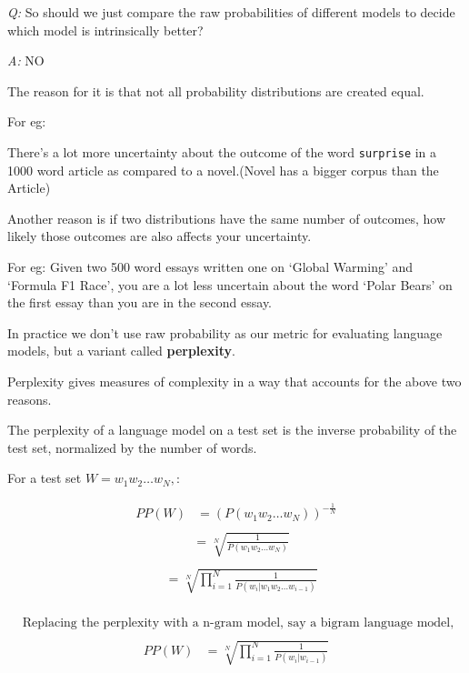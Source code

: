 \documentclass[11pt]{article}
\begin{document}
\emph{Q:} So should we just compare the raw probabilities of different
models to decide which model is intrinsically better?

\emph{A:} NO

The reason for it is that not all probability distributions are created
equal.

For eg:

There's a lot more uncertainty about the outcome of the word
\texttt{surprise} in a 1000 word article as compared to a novel.(Novel
has a bigger corpus than the Article)

Another reason is if two distributions have the same number of outcomes,
how likely those outcomes are also affects your uncertainty.

For eg: Given two 500 word essays written one on `Global Warming' and
`Formula F1 Race', you are a lot less uncertain about the word `Polar
Bears' on the first essay than you are in the second essay.

In practice we don't use raw probability as our metric for evaluating
language models, but a variant called \textbf{perplexity}.

Perplexity gives measures of complexity in a way that accounts for the
above two reasons.

The perplexity of a language model on a test set is the inverse
probability of the test set, normalized by the number of words.

For a test set \(W = w_1 w_2 \dots w_N ,\):

\[\begin{align} PP(W) &= {(P(w_1 w_2 \dots w_N))}^{-\frac{1}{N}}\\\end{align}\]
\[\begin{align}&= \sqrt[N]{\frac{1}{P(w_1 w_2 \dots w_N)}} \\\end{align}\]
\[\begin{align}&= \sqrt[N]{\prod_{i=1}^{N}\frac{1}{P(w_i|w_1 w_2 \dots w_{i-1})}}\\\end{align}\]

\[\begin{align}&\text{Replacing the perplexity with a n-gram model, say a bigram language model, we get :}\\\end{align}\]
\[\begin{align}PP(W) &= \sqrt[N]{\prod_{i=1}^{N}\frac{1}{P(w_i|w_{i-1})}}\\\end{align}\]
\end{document}
